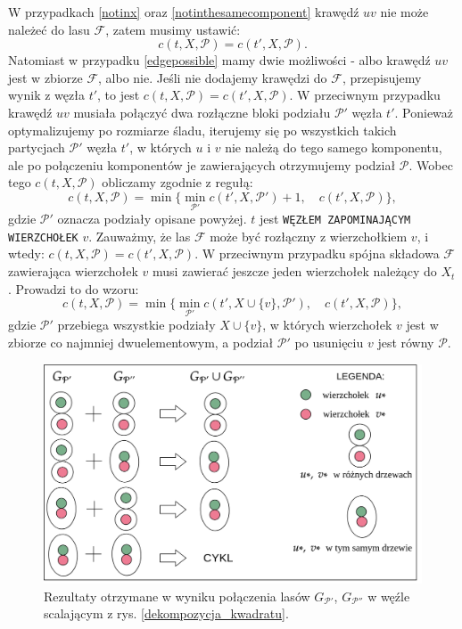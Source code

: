 \documentclass[12pt, oneside]{report}
\begin{document}
\noindent W przypadkach \ref{notinx} oraz \ref{notinthesamecomponent} krawędź $uv$ nie może należeć do lasu $\mathcal{F}$, zatem musimy ustawić: 
$$c(t, X, \mathcal{P}) = c(t', X, \mathcal{P}).$$
Natomiast w przypadku \ref{edgepossible} mamy dwie możliwości - albo krawędź $uv$ jest w zbiorze $\mathcal{F}$, albo nie. Jeśli nie dodajemy krawędzi do $\mathcal{F}$, przepisujemy wynik z węzła $t'$, to jest $c(t, X, \mathcal{P}) = c(t', X, \mathcal{P})$. W przeciwnym przypadku krawędź $uv$ musiała połączyć dwa rozłączne bloki podziału $\mathcal{P}'$ węzła $t'$. Ponieważ optymalizujemy po rozmiarze śladu, iterujemy się po wszystkich takich partycjach $\mathcal{P}'$ węzła $t'$, w których $u$ i $v$ nie należą do tego samego komponentu, ale po połączeniu komponentów je zawierających otrzymujemy podział $\mathcal{P}$. Wobec tego $c(t, X, \mathcal{P})$ obliczamy zgodnie z regułą:
$$c(t, X, \mathcal{P}) = \min \big\{ \min\limits_{\mathcal{P}'} c(t', X, \mathcal{P}') + 1, \quad c(t', X, \mathcal{P}) \big\},$$ gdzie $\mathcal{P'}$ oznacza podziały opisane powyżej.
\newline\newline
$t$ jest \texttt{WĘZŁEM ZAPOMINAJĄCYM WIERZCHOŁEK} $v$. Zauważmy, że las $\mathcal{F}$ może być rozłączny z wierzchołkiem $v$, i wtedy: $c(t, X, \mathcal{P}) = c(t', X, \mathcal{P})$.
W przeciwnym przypadku spójna składowa $\mathcal{F}$ zawierająca wierzchołek $v$ musi zawierać jeszcze jeden wierzchołek należący do $X_t$. Prowadzi to do wzoru:
$$c(t, X, \mathcal{P}) = \min \big\{ \min\limits_{\mathcal{P}'} c(t', X \cup \{v\}, \mathcal{P}'), \quad c(t', X, \mathcal{P}) \big\},$$ gdzie $\mathcal{P'}$ przebiega wszystkie podziały $X \cup \{v\}$, w których wierzchołek $v$ jest w zbiorze co najmniej dwuelementowym, a podział $\mathcal{P}'$ po usunięciu $v$ jest równy $\mathcal{P}$.
\newline\newline
\begin{figure}
\centering
\includegraphics[width=16cm]{find_n_union.png}
\caption{Rezultaty otrzymane w wyniku połączenia lasów $G_{\mathcal{P}'}$, $G_{\mathcal{P}''}$ w węźle scalającym z rys. \ref{dekompozycja_kwadratu}.}
\label{find_n_union}
\end{figure}
\end{document}

